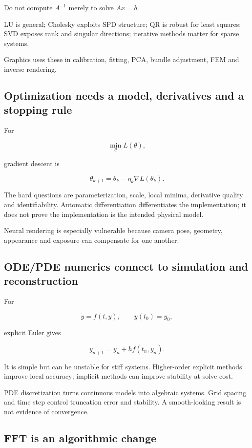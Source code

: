 Do not compute \(A^{-1}\) merely to solve \(Ax=b\).

LU is general; Cholesky exploits SPD structure; QR is robust for least squares; SVD exposes rank and singular directions; iterative methods matter for sparse systems.

Graphics uses these in calibration, fitting, PCA, bundle adjustment, FEM and inverse rendering.

\subsection{Optimization needs a model, derivatives and a stopping rule}\label{01-foundations-i-ch017-optimization-needs-a-model-derivatives-and-a-stopping-rule}

For

\[
\min_\theta L(\theta),
\]

gradient descent is

\[
\theta_{k+1}=\theta_k-\eta_k\nabla L(\theta_k).
\]

The hard questions are parameterization, scale, local minima, derivative quality and identifiability. Automatic differentiation differentiates the implementation; it does not prove the implementation is the intended physical model.

Neural rendering is especially vulnerable because camera pose, geometry, appearance and exposure can compensate for one another.

\subsection{ODE/PDE numerics connect to simulation and reconstruction}\label{01-foundations-i-ch017-odepde-numerics-connect-to-simulation-and-reconstruction}

For

\[
\dot y=f(t,y),\qquad y(t_0)=y_0,
\]

explicit Euler gives

\[
y_{n+1}=y_n+h f(t_n,y_n).
\]

It is simple but can be unstable for stiff systems. Higher-order explicit methods improve local accuracy; implicit methods can improve stability at solve cost.

PDE discretization turns continuous models into algebraic systems. Grid spacing and time step control truncation error and stability. A smooth-looking result is not evidence of convergence.

\subsection{FFT is an algorithmic change}\label{01-foundations-i-ch017-fft-is-an-algorithmic-change}

